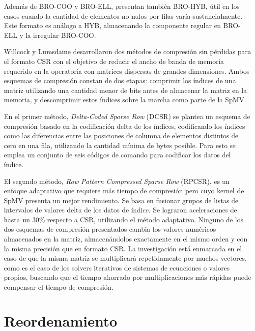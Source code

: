 Además de BRO-COO y BRO-ELL, presentan también BRO-HYB, útil en los casos cuando la cantidad de elementos no nulos por filas varía sustancialmente. Este formato es análogo a HYB,  almacenando la componente regular en BRO-ELL y la irregular BRO-COO.


Willcock y Lumsdaine \cite{Willcock2006} desarrollaron dos métodos de compresión sin pérdidas para el formato CSR con el objetivo de reducir el ancho de banda de memoria requerido en la operatoria con matrices dispersas de grandes dimensiones. 
Ambos esquemas de compresión constan de dos etapas: comprimir los índices de una matriz utilizando una cantidad menor de bits antes de almacenar la matriz en la memoria, y descomprimir estos índices sobre la marcha como parte de la SpMV.

En el primer método, \textit{Delta-Coded Sparse Row} (DCSR) se plantea un esquema de compresión basado en la codificación delta de los índices, codificando los índices como las diferencias entre las posiciones de columna de elementos distintos de cero en una fila, utilizando la cantidad mínima de bytes posible. 
Para esto se emplea un conjunto de seis códigos de comando para codificar los datos del índice. 

 El segundo método, \textit{Row Pattern Compressed Sparse Row} (RPCSR), es un enfoque adaptativo que requiere más tiempo de compresión pero cuyo kernel de SpMV presenta un mejor rendimiento. Se basa en fusionar grupos de listas de intervalos de valores delta de los datos de índice. Se lograron aceleraciones de hasta un 30\% respecto a CSR, utilizando el método adaptativo. 
Ninguno de los dos esquemas de compresión presentados cambia los valores numéricos almacenados en la matriz, almacenándolos exactamente en el mismo orden y con la misma precisión que en formato CSR. La investigación está enmarcada en el caso de que la misma matriz se multiplicará repetidamente por muchos vectores, como es el caso de los solvers iterativos de sistemas de ecuaciones o valores propios,
buscando que el tiempo ahorrado por multiplicaciones más rápidas puede compensar el tiempo de compresión.




\section{Reordenamiento}\label{sec:reord}



